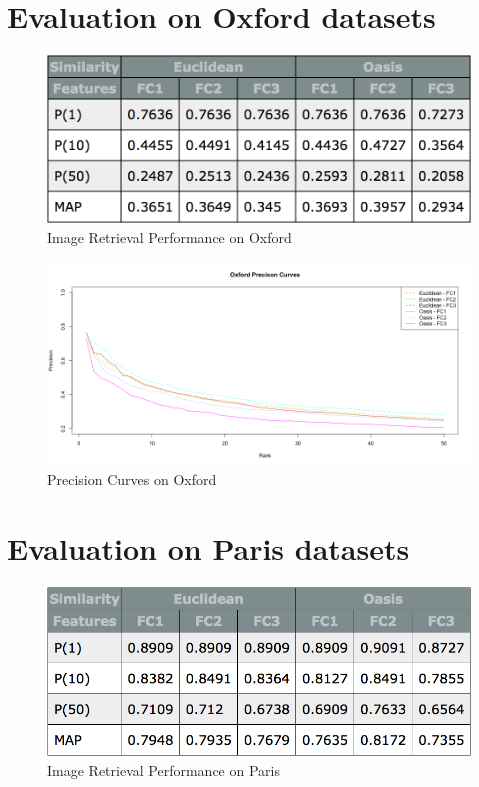 \documentclass{report}
\begin{document}
  \section{Evaluation on Oxford datasets}

    \begin{figure}[H]
      \caption{Image Retrieval Performance on Oxford}
      \centering
      \includegraphics[scale=0.3]{images/evaluation/oxford_metrics_tables.png}
    \end{figure}

    \begin{figure}[H]
      \caption{Precision Curves on Oxford}
      \centering
      \includegraphics[scale=0.45]{images/evaluation/oxford_prec_curves.png}
    \end{figure}

    \section{Evaluation on Paris datasets}

      \begin{figure}[H]
        \caption{Image Retrieval Performance on Paris}
        \centering
        \includegraphics[scale=0.3]{images/evaluation/paris_metrics_tables.png}
      \end{figure}
\end{document}
